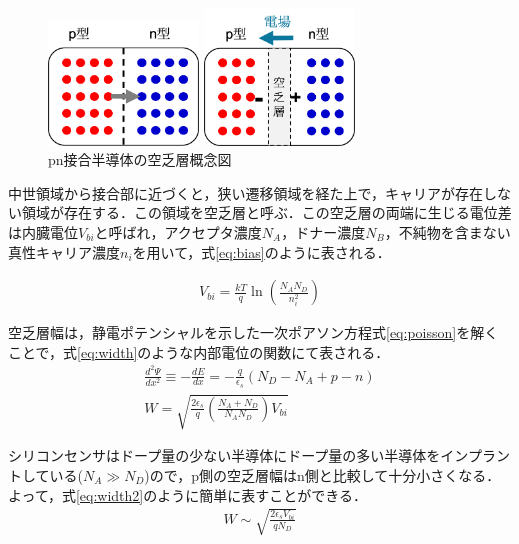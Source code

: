 \begin{figure}[h]
  \centering
  \begin{minipage}[b]{0.45\linewidth}
    \centering
    \includegraphics[width=4cm]{./figure/semiku1.png}
  \end{minipage}
  \begin{minipage}[b]{0.45\linewidth}
    \centering
    \includegraphics[width=4cm]{./figure/semiku2.png}
  \end{minipage}
  \caption{pn接合半導体の空乏層概念図}
  \label{fig:pn}
\end{figure}


中世領域から接合部に近づくと，狭い遷移領域を経た上で，キャリアが存在しない領域が存在する．この領域を空乏層と呼ぶ．この空乏層の両端に生じる電位差は内臓電位$V_{bi}$と呼ばれ，アクセプタ濃度$N_A$，ドナー濃度$N_B$，不純物を含まない真性キャリア濃度$n_i$を用いて，式\ref{eq:bias}のように表される．\par
\begin{eqnarray}
  \label{eq:bias}
  V_{bi} = \frac{kT}{q} \ln \left( \frac{N_A N_D}{n_i^2} \right) 
\end{eqnarray}

空乏層幅は，静電ポテンシャルを示した一次ポアソン方程式\ref{eq:poisson}を解くことで，式\ref{eq:width}のような内部電位の関数にて表される．
\begin{eqnarray}
  \label{eq:poisson}
  \frac{d^2\Psi}{dx^2} \equiv -\frac{dE}{dx} = - \frac{q}{\epsilon_s}(N_D - N_A + p - n) \\
  \label{eq:width}
  W = \sqrt{ \frac{2\epsilon_s}{q} \left( \frac{N_A+N_D}{N_A N_D} \right) V_{bi}}
\end{eqnarray}

シリコンセンサはドープ量の少ない半導体にドープ量の多い半導体をインプラントしている($N_A \gg N_D$)ので，p側の空乏層幅はn側と比較して十分小さくなる．よって，式\ref{eq:width2}のように簡単に表すことができる．
\begin{eqnarray}
  \label{eq:width2}
  W \sim \sqrt{ \frac{2\epsilon_s V_{bi}}{q N_D} }
\end{eqnarray}

